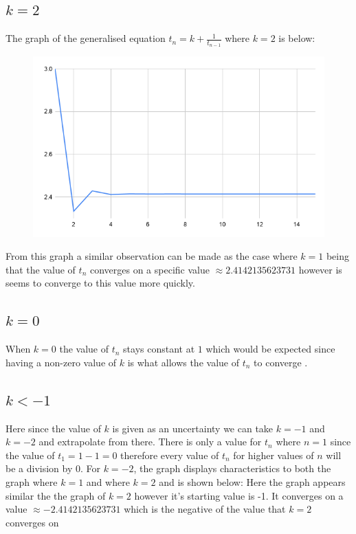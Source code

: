 \documentclass[11pt]{article}
\begin{document}
\subsection{\(k=2\)}
\label{sec:org1b5715e}
The graph of the generalised equation \(t_n=k+\frac{1}{t_{n-1}}\) where \(k=2\) is below:
\begin{figure}[h]
\includegraphics[scale=0.5]{chart2}
\end{figure}
From this graph a similar observation can be made as the case where \(k=1\) being that the value of \(t_n\) converges on a specific value \(\approx 2.4142135623731\) however is seems to converge to this value more quickly.
\subsection{\(k=0\)}
\label{sec:org53b53f8}
When \(k=0\) the value of \(t_n\) stays constant at \(1\) which would be expected since having a non-zero value of \(k\) is what allows the value of \(t_n\) to converge    .
\subsection{\(k < -1\)}
\label{sec:org43b7c5c}
Here since the value of \(k\) is given as an uncertainty we can take \(k=-1\) and \(k=-2\) and extrapolate from there. There is only a value for \(t_n\) where \(n=1\) since the value of \(t_1=1-1=0\) therefore every value of \(t_n\) for higher values of \(n\) will be a division by \(0\).
For \(k=-2\), the graph displays characteristics to both the graph where \(k=1\) and where \(k=2\) and is shown below:
Here the graph appears similar the the graph of \(k=2\) however it's starting value is -1. It converges on a value \(\approx -2.4142135623731\) which is the negative of the value that \(k=2\) converges on
\end{document}
